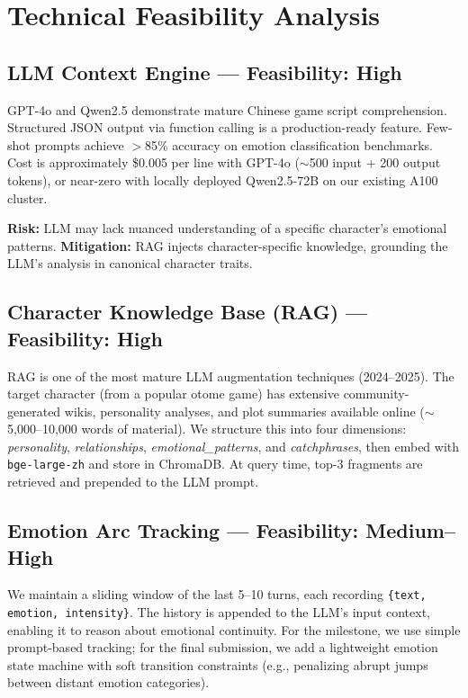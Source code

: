 \documentclass[11pt,a4paper]{article}
\begin{document}
\section{Technical Feasibility Analysis}

\subsection{LLM Context Engine --- Feasibility: High}

GPT-4o and Qwen2.5 demonstrate mature Chinese game script comprehension. Structured JSON output via function calling is a production-ready feature. Few-shot prompts achieve $>$85\% accuracy on emotion classification benchmarks. Cost is approximately \$0.005 per line with GPT-4o ($\sim$500 input + 200 output tokens), or near-zero with locally deployed Qwen2.5-72B on our existing A100 cluster.

\textbf{Risk:} LLM may lack nuanced understanding of a specific character's emotional patterns. \textbf{Mitigation:} RAG injects character-specific knowledge, grounding the LLM's analysis in canonical character traits.

\subsection{Character Knowledge Base (RAG) --- Feasibility: High}

RAG is one of the most mature LLM augmentation techniques (2024--2025). The target character (from a popular otome game) has extensive community-generated wikis, personality analyses, and plot summaries available online ($\sim$5,000--10,000 words of material). We structure this into four dimensions: \emph{personality}, \emph{relationships}, \emph{emotional\_patterns}, and \emph{catchphrases}, then embed with \texttt{bge-large-zh} and store in ChromaDB. At query time, top-3 fragments are retrieved and prepended to the LLM prompt.

\subsection{Emotion Arc Tracking --- Feasibility: Medium--High}

We maintain a sliding window of the last 5--10 turns, each recording \texttt{\{text, emotion, intensity\}}. The history is appended to the LLM's input context, enabling it to reason about emotional continuity. For the milestone, we use simple prompt-based tracking; for the final submission, we add a lightweight emotion state machine with soft transition constraints (e.g., penalizing abrupt jumps between distant emotion categories).
\end{document}
